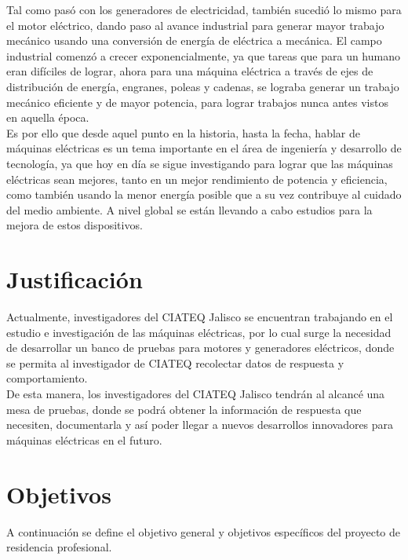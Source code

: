 \documentclass[12pt,titlepage]{article}
\begin{document}
Tal como pasó con los generadores de electricidad, también sucedió lo mismo para el motor eléctrico, dando paso al avance industrial para generar mayor trabajo mecánico usando una conversión de energía de eléctrica a mecánica. El campo industrial comenzó a crecer exponencialmente, ya que tareas que para un humano eran difíciles de lograr, ahora para una máquina eléctrica a través de ejes de distribución de energía, engranes, poleas y cadenas, se lograba generar un trabajo mecánico eficiente y de mayor potencia, para lograr trabajos nunca antes vistos en aquella época. \\[0.15mm]

Es por ello que desde aquel punto en la historia, hasta la fecha, hablar de máquinas eléctricas es un tema importante en el área de ingeniería y desarrollo de tecnología, ya que hoy en día se sigue investigando para lograr que las máquinas eléctricas sean mejores, tanto en un mejor rendimiento de potencia y eficiencia, como también usando la menor energía posible que a su vez contribuye al cuidado del medio ambiente.  A nivel global se están llevando a cabo estudios para la mejora de estos dispositivos. \\[0.3mm]


\newpage
\section{Justificación}

Actualmente, investigadores del CIATEQ Jalisco  se encuentran trabajando en el estudio e investigación de las máquinas eléctricas, por lo cual surge la necesidad de desarrollar un banco de pruebas para motores y generadores eléctricos, donde se permita al investigador de CIATEQ recolectar datos de respuesta y comportamiento.\\

De esta manera, los investigadores del CIATEQ Jalisco tendrán al alcancé una mesa de pruebas, donde se podrá obtener la información de respuesta que necesiten, documentarla y así poder llegar  a nuevos desarrollos innovadores para máquinas eléctricas en el futuro. \\

\newpage 
\section{Objetivos}
A continuación se define el objetivo general y objetivos específicos del proyecto de residencia profesional. 
\end{document}
